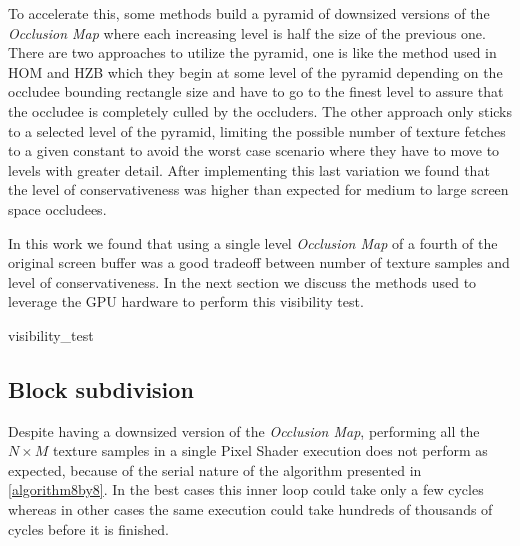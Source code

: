 \documentclass[10pt, conference]{IEEEtran}
\begin{document}
To accelerate this, some methods build a pyramid of downsized versions of the \emph{Occlusion Map} where each increasing level is half the size of the previous one. 
There are two approaches to utilize the pyramid, one is like the method used in HOM \cite{hom} and HZB \cite{Hierarchical_zbuffer} which they begin at 
some level of the pyramid depending on the occludee bounding rectangle size and have to go to the finest level to assure that the occludee is completely 
culled by the occluders.
The other approach \cite{rakos,darnell} only sticks to a selected level of the pyramid, limiting the possible number of texture fetches to a given 
constant to avoid the worst case scenario where they have to move to levels with greater detail. 
After implementing this last variation we found that the level of conservativeness was higher than expected for medium to large screen space occludees.\

In this work we found that using a single level \emph{Occlusion Map} of a fourth of the original screen buffer was a good tradeoff between number of texture samples 
and level of conservativeness. In the next section we discuss the methods used to leverage the GPU hardware to perform this visibility test.


{visibility_test}{
%
}



\subsection{Block subdivision}
%
Despite having a downsized version of the \emph{Occlusion Map}, performing all the $N \times M$ texture samples in a single Pixel Shader execution 
does not perform as expected, because of the serial nature of the algorithm presented in \ref{algorithm8by8}. 
In the best cases this inner loop could take only a few cycles whereas in other cases the same execution could take hundreds of thousands of cycles before it is finished.\
\end{document}
